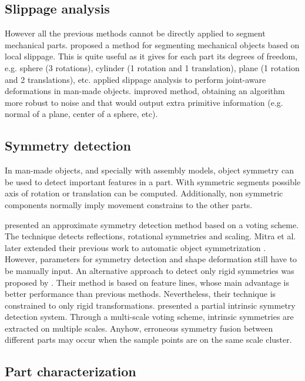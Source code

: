 \subsection{Slippage analysis}
\label{SlippageAnalysis}

However all the previous methods cannot be directly applied to segment mechanical parts.
\cite{Gelfand2004} proposed a method for segmenting mechanical objects based on local slippage.
This is quite useful as it gives for each part its degrees of freedom, e.g. sphere (3 rotations), cylinder (1 rotation and 1 translation), plane (1 rotation and 2 translations), etc.
\cite{Xu2009} applied slippage analysis to perform joint-aware deformations in man-made objects.
\cite{Yi2014} improved \cite{Gelfand2004} method, obtaining an algorithm more robust to noise and that would output extra primitive information (e.g. normal of a plane, center of a sphere, etc).

\subsection{Symmetry detection}
\label{sec:symmetryDetection}

In man-made objects, and specially with assembly models, object symmetry can be used to detect important features in a part.
With symmetric segments possible axis of rotation or translation can be computed.
Additionally, non symmetric components normally imply movement constrains to the other parts.

\cite{Mitra2006} presented an approximate symmetry detection method based on a voting scheme.
The technique detects reflections, rotational symmetries and scaling.
Mitra et al. later extended their previous work to automatic object symmetrization \cite{Mitra2007}.
However, parameters for symmetry detection and shape deformation still have to be manually input.
An alternative approach to detect only rigid symmetries was proposed by \cite{Bokeloh2009}.
Their method is based on feature lines, whose main advantage is better performance than previous methods.
Nevertheless, their technique is constrained to only rigid transformations.
\cite{Xu2012} presented a partial intrinsic symmetry detection system.
Through a multi-scale voting scheme, intrinsic symmetries are extracted on multiple scales.
Anyhow, erroneous symmetry fusion between different parts may occur when the sample points are on the same scale cluster. 

\subsection{Part characterization}

